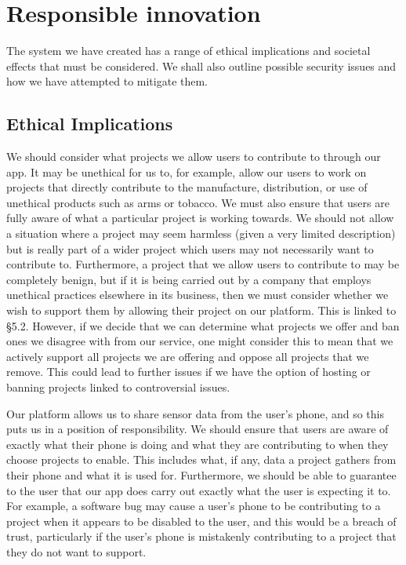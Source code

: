 \documentclass{article}
\begin{document}
\section{Responsible innovation}
The system we have created has a range of ethical implications and societal effects that must be considered. We shall also outline possible
security issues and how we have attempted to mitigate them.
\subsection{Ethical Implications}
We should consider what projects we allow users to contribute to through our app. It may be unethical for us to, for example, allow our
users to work on projects that directly contribute to the manufacture, distribution, or use of unethical products such as arms or tobacco.
We must also ensure that users are fully aware of what a particular project is working towards. We should not allow a situation where a project
may seem harmless (given a very limited description) but is really part of a wider project which users may not necessarily want to contribute to.
Furthermore, a project that we allow users to contribute to may be completely benign, but if it is being carried out by a company that employs
unethical practices elsewhere in its business, then we must consider whether we wish to support them by allowing their project on our platform.
This is linked to §5.2.
However, if we decide that we can determine what projects we offer and ban ones we disagree with from our service, one might consider this to mean
that we actively support all projects we are offering and oppose all projects that we remove. This could lead to further issues if we have the
option of hosting or banning projects linked to controversial issues.

Our platform allows us to share sensor data from the user’s phone, and so this puts us in a position of responsibility. We should ensure that
users are aware of exactly what their phone is doing and what they are contributing to when they choose projects to enable. This includes what,
if any, data a project gathers from their phone and what it is used for. Furthermore, we should be able to guarantee to the user that our app
does carry out exactly what the user is expecting it to. For example, a software bug may cause a user’s phone to be contributing to a project
when it appears to be disabled to the user, and this would be a breach of trust, particularly if the user’s phone is mistakenly contributing
to a project that they do not want to support.
\end{document}
